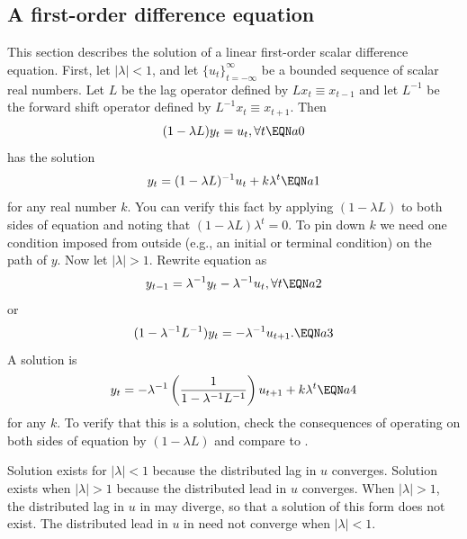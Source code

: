 \subsection{A first-order difference equation}
This section describes the solution of a linear
first-order scalar difference equation.
First, let $ |\lambda | < 1$, and let $\{u_t\}_{t=-\infty}^\infty$ be a
bounded sequence  of scalar real numbers. Let $L$ be the
lag operator defined by $L x_t \equiv x_{t-1}$ and
let $L^{-1}$ be the forward shift operator defined by $L^{-1} x_t \equiv x_{t+1}$.
Then $$(1 - \lambda L) y_t = u_t, \forall t \EQN a0 $$
has the solution
$$y_t = (1 -\lambda L)^{-1} u_t +k \lambda^t \EQN a1$$ for
any real number $k$.  You can verify this fact by applying
$(1-\lambda L)$ to both sides  of equation  and noting
that $(1 - \lambda L) \lambda^t =0$.
To pin down $k$ we need one condition imposed from outside
(e.g., an initial or terminal condition)
on the path of $y$.
\medskip
Now let $| \lambda | > 1$.   Rewrite equation  as
$$ y_{t-1} = \lambda^{-1} y_t - \lambda^{-1} u_t , \forall t \EQN a2 $$
or
$$ (1 - \lambda^{-1} L^{-1}) y_t = - \lambda^{-1} u_{t+1}. \EQN a3 $$
A solution is
$$ y_t = - \lambda^{-1}\left({ 1 \over  1 - \lambda^{-1} L^{-1}} \right)
        u_{t+1} + k \lambda^t \EQN a4  $$
for any $k$.  To verify that  this is a solution,
check the consequences of operating on both sides of equation 
by $(1 -\lambda L)$ and compare to  .

\medskip
Solution  exists for $|\lambda  | < 1$ because the
distributed lag in $u$ converges.  Solution    exists
when $|\lambda| > 1$ because the distributed lead in $u$ converges.
When $|\lambda | > 1$, the distributed lag in $u$ in  may
diverge, so that a solution of this form does not exist.
The distributed lead in $u$ in  need not converge
when $|\lambda| < 1$.



